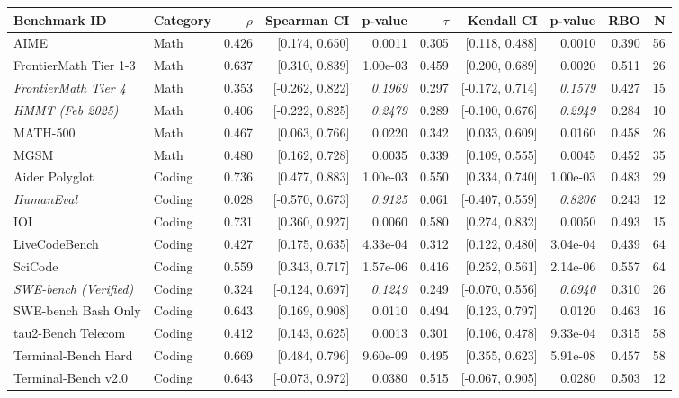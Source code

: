 \begin{tabular}{llrrrrrrrr}
\toprule
Benchmark ID & Category & $\rho$ & Spearman CI & p-value & $\tau$ & Kendall CI & p-value & RBO & N \\
\midrule
AIME & Math & 0.426 & [0.174, 0.650] & 0.0011 & 0.305 & [0.118, 0.488] & 0.0010 & 0.390 & 56 \\
FrontierMath Tier 1-3 & Math & 0.637 & [0.310, 0.839] & 1.00e-03 & 0.459 & [0.200, 0.689] & 0.0020 & 0.511 & 26 \\
\itshape FrontierMath Tier 4 & Math & 0.353 & [-0.262, 0.822] & \itshape 0.1969 & 0.297 & [-0.172, 0.714] & \itshape 0.1579 & 0.427 & 15 \\
\itshape HMMT (Feb 2025) & Math & 0.406 & [-0.222, 0.825] & \itshape 0.2479 & 0.289 & [-0.100, 0.676] & \itshape 0.2949 & 0.284 & 10 \\
MATH-500 & Math & 0.467 & [0.063, 0.766] & 0.0220 & 0.342 & [0.033, 0.609] & 0.0160 & 0.458 & 26 \\
MGSM & Math & 0.480 & [0.162, 0.728] & 0.0035 & 0.339 & [0.109, 0.555] & 0.0045 & 0.452 & 35 \\
Aider Polyglot & Coding & 0.736 & [0.477, 0.883] & 1.00e-03 & 0.550 & [0.334, 0.740] & 1.00e-03 & 0.483 & 29 \\
\itshape HumanEval & Coding & 0.028 & [-0.570, 0.673] & \itshape 0.9125 & 0.061 & [-0.407, 0.559] & \itshape 0.8206 & 0.243 & 12 \\
IOI & Coding & 0.731 & [0.360, 0.927] & 0.0060 & 0.580 & [0.274, 0.832] & 0.0050 & 0.493 & 15 \\
LiveCodeBench & Coding & 0.427 & [0.175, 0.635] & 4.33e-04 & 0.312 & [0.122, 0.480] & 3.04e-04 & 0.439 & 64 \\
SciCode & Coding & 0.559 & [0.343, 0.717] & 1.57e-06 & 0.416 & [0.252, 0.561] & 2.14e-06 & 0.557 & 64 \\
\itshape SWE-bench (Verified) & Coding & 0.324 & [-0.124, 0.697] & \itshape 0.1249 & 0.249 & [-0.070, 0.556] & \itshape 0.0940 & 0.310 & 26 \\
SWE-bench Bash Only & Coding & 0.643 & [0.169, 0.908] & 0.0110 & 0.494 & [0.123, 0.797] & 0.0120 & 0.463 & 16 \\
tau2-Bench Telecom & Coding & 0.412 & [0.143, 0.625] & 0.0013 & 0.301 & [0.106, 0.478] & 9.33e-04 & 0.315 & 58 \\
Terminal-Bench Hard & Coding & 0.669 & [0.484, 0.796] & 9.60e-09 & 0.495 & [0.355, 0.623] & 5.91e-08 & 0.457 & 58 \\
Terminal-Bench v2.0 & Coding & 0.643 & [-0.073, 0.972] & 0.0380 & 0.515 & [-0.067, 0.905] & 0.0280 & 0.503 & 12 \\

\end{tabular}
